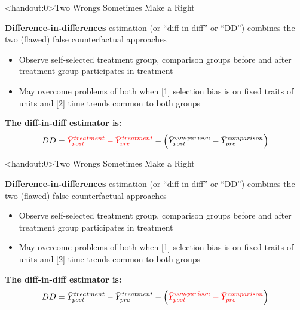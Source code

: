 \documentclass[10pt,xcolor=table,ignorenonframetext,handout,aspectratio=169]{beamer}
\newlength{\wideitemsep}
\let\olditem\item
\renewcommand{\item}{\setlength{\itemsep}{\wideitemsep}\olditem}
\begin{document}

\begin{frame}<handout:0>{Two Wrongs Sometimes Make a Right}

\medskip

\textbf{Difference-in-differences} estimation (or ``diff-in-diff'' or ``DD'') combines the two (flawed) false counterfactual approaches

\medskip
\begin{itemize}
	
	\item Observe self-selected treatment group, comparison groups before and after treatment group participates in treatment
	
	\item May overcome problems of both when [1] selection bias is on fixed traits of units and [2] time trends common to both groups
	
	
\end{itemize}

\medskip
\medskip

\textbf{The diff-in-diff estimator is:}
\begin{equation*}
DD = \textcolor{red}{\bar{Y}^{treatment}_{post} - \bar{Y}^{treatment}_{pre}} - \left( \textcolor{black}{\bar{Y}^{comparison}_{post} - \bar{Y}^{comparison}_{pre}}  \right)
\end{equation*}

\end{frame}



\begin{frame}<handout:0>{Two Wrongs Sometimes Make a Right}

\medskip

\textbf{Difference-in-differences} estimation (or ``diff-in-diff'' or ``DD'') combines the two (flawed) false counterfactual approaches

\medskip
\begin{itemize}
	
	\item Observe self-selected treatment group, comparison groups before and after treatment group participates in treatment
	
	\item May overcome problems of both when [1] selection bias is on fixed traits of units and [2] time trends common to both groups
	
	
\end{itemize}

\medskip
\medskip

\textbf{The diff-in-diff estimator is:}
\begin{equation*}
DD = \textcolor{black}{\bar{Y}^{treatment}_{post} - \bar{Y}^{treatment}_{pre}} - \left( \textcolor{red}{\bar{Y}^{comparison}_{post} - \bar{Y}^{comparison}_{pre}}  \right)
\end{equation*}

\end{frame}
\end{document}
